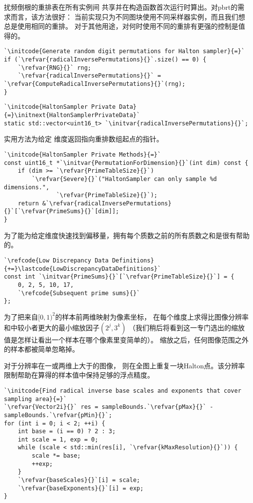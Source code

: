 扰频倒根的重排表在所有实例间
共享并在构造函数首次运行时算出。对pbrt的需求而言，该方法很好：
当前实现只为不同图块使用不同采样器实例，而且我们想总是使用相同的重排。
对于其他用途，对何时使用不同的重排有更强的控制是值得的。
\begin{lstlisting}
`\initcode{Generate random digit permutations for Halton sampler}{=}`
if (`\refvar{radicalInversePermutations}{}`.size() == 0) {
    `\refvar{RNG}{}` rng;
    `\refvar{radicalInversePermutations}{}` = `\refvar{ComputeRadicalInversePermutations}{}`(rng);
}
\end{lstlisting}
\begin{lstlisting}
`\initcode{HaltonSampler Private Data}{=}\initnext{HaltonSamplerPrivateData}`
static std::vector<uint16_t> `\initvar{radicalInversePermutations}{}`;
\end{lstlisting}

实用方法为给定
维度返回指向重排数组起点的指针。
\begin{lstlisting}
`\initcode{HaltonSampler Private Methods}{=}`
const uint16_t *`\initvar{PermutationForDimension}{}`(int dim) const {
    if (dim >= `\refvar{PrimeTableSize}{}`)
        `\refvar{Severe}{}`("HaltonSampler can only sample %d dimensions.",
               `\refvar{PrimeTableSize}{}`);
    return &`\refvar{radicalInversePermutations}{}`[`\refvar{PrimeSums}{}`[dim]];
}
\end{lstlisting}

为了能为给定维度快速找到偏移量，拥有每个质数之前的所有质数之和是很有帮助的。
\begin{lstlisting}
`\refcode{Low Discrepancy Data Definitions}{+=}\lastcode{LowDiscrepancyDataDefinitions}`
const int `\initvar{PrimeSums}{}`[`\refvar{PrimeTableSize}{}`] = {
    0, 2, 5, 10, 17, 
    `\refcode{Subsequent prime sums}{}`
};
\end{lstlisting}

为了把来自$[0,1)^2$的样本前两维映射为像素坐标，
在每个维度上求得比图像分辨率
和中较小者更大的最小缩放因子$(2^j,3^k)$
（我们稍后将看到这一专门选出的缩放值是怎样让看出一个样本在哪个像素里变简单的）。
缩放之后，任何图像范围之外的样本都被简单忽略掉。

对于分辨率在一或两维上大于的图像，
则在全图上重复一块Halton点。该分辨率限制帮助在算得的样本值中保持足够的浮点精度。
\begin{lstlisting}
`\initcode{Find radical inverse base scales and exponents that cover sampling area}{=}`
`\refvar{Vector2i}{}` res = sampleBounds.`\refvar{pMax}{}` - sampleBounds.`\refvar{pMin}{}`;
for (int i = 0; i < 2; ++i) {
    int base = (i == 0) ? 2 : 3;
    int scale = 1, exp = 0;
    while (scale < std::min(res[i], `\refvar{kMaxResolution}{}`)) {
        scale *= base;
        ++exp;
    }
    `\refvar{baseScales}{}`[i] = scale;
    `\refvar{baseExponents}{}`[i] = exp;
}
\end{lstlisting}

